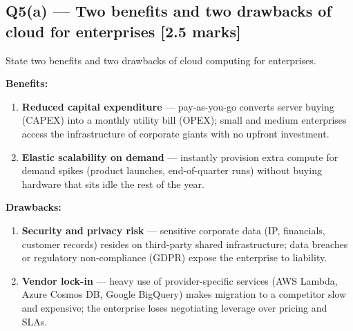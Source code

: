 \documentclass[12pt, a4paper]{article}
\newenvironment{qbox}{\begin{mdframed}[style=qframe]}{\end{mdframed}}
\newenvironment{solbox}{\begin{mdframed}[style=solframe]}{\end{mdframed}}
\newcommand{\qmarks}[1]{\hfill\textbf{\color{orange!70!black}[#1 marks]}}
\begin{document}
\subsection{Q5(a) --- Two benefits and two drawbacks of cloud for enterprises
  \texorpdfstring{\qmarks{2.5}}{}}
\begin{qbox}State two benefits and two drawbacks of cloud computing for enterprises.\end{qbox}
\begin{solbox}
\textbf{Benefits:}
\begin{enumerate}[leftmargin=1.6cm, itemsep=3pt]
  \item \textbf{Reduced capital expenditure} --- pay-as-you-go converts server buying (CAPEX)
    into a monthly utility bill (OPEX); small and medium enterprises access the infrastructure
    of corporate giants with no upfront investment.
  \item \textbf{Elastic scalability on demand} --- instantly provision extra compute for
    demand spikes (product launches, end-of-quarter runs) without buying hardware that sits
    idle the rest of the year.
\end{enumerate}

\textbf{Drawbacks:}
\begin{enumerate}[leftmargin=1.6cm, itemsep=3pt]
  \item \textbf{Security and privacy risk} --- sensitive corporate data (IP, financials,
    customer records) resides on third-party shared infrastructure; data breaches or
    regulatory non-compliance (GDPR) expose the enterprise to liability.
  \item \textbf{Vendor lock-in} --- heavy use of provider-specific services (AWS Lambda,
    Azure Cosmos DB, Google BigQuery) makes migration to a competitor slow and expensive;
    the enterprise loses negotiating leverage over pricing and SLAs.
\end{enumerate}
\end{solbox}

\end{document}
